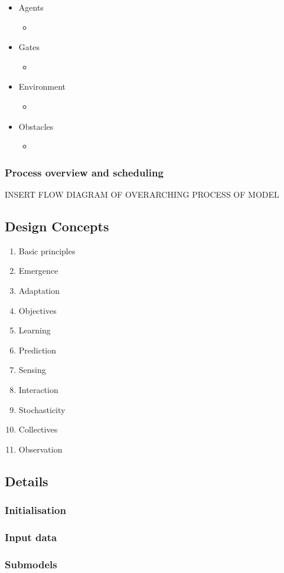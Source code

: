 \begin{itemize}
    \item Agents
    \begin{itemize}
        \item
    \end{itemize}
    \item Gates
    \begin{itemize}
        \item
    \end{itemize}
    \item Environment
    \begin{itemize}
        \item
    \end{itemize}
    \item Obstacles
    \begin{itemize}
        \item
    \end{itemize}
\end{itemize}

\subsubsection{Process overview and scheduling}
\label{subs:stationsim:overview:process}

INSERT FLOW DIAGRAM OF OVERARCHING PROCESS OF MODEL

\subsection{Design Concepts}
\label{sub:stationsim:design_concepts}

\begin{enumerate}
    \item Basic principles
    \item Emergence
    \item Adaptation
    \item Objectives
    \item Learning
    \item Prediction
    \item Sensing
    \item Interaction
    \item Stochasticity
    \item Collectives
    \item Observation
\end{enumerate}

\subsection{Details}
\label{sub:stationsim:details}

\subsubsection{Initialisation}
\label{subs:stationsim:details:initialisation}

\subsubsection{Input data}
\label{subs:stationsim:details:input}

\subsubsection{Submodels}
\label{subs:stationsim:details:submodels}

